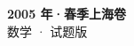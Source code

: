 \documentclass[zihao=-4, a4paper]{ctexart}
\begin{document}
\begin{center}
  {\Large\bfseries 2005 年·春季上海卷}\\[4pt]
  {\large 数学 · 试题版}
\end{center}
\medskip
{}

\end{document}
